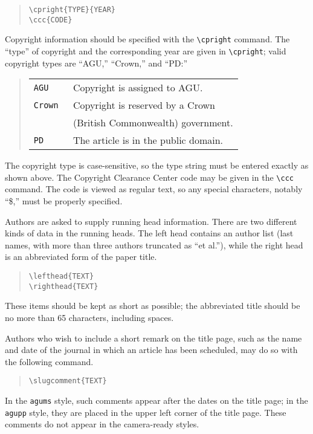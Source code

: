 \begin{quote}
\verb"\cpright{TYPE}{YEAR}"\\
\verb"\ccc{CODE}"
\end{quote}

Copyright information should be specified with the \verb"\cpright" 
command.  The ``type'' of copyright and the corresponding year are 
given in \verb"\cpright"; valid copyright types are ``AGU,'' 
``Crown,'' and ``PD:''
\begin{center}
\begin{quote}
\begin{tabular}{l@{\quad}p{3in}}
\tt AGU & Copyright is assigned to AGU.\\
\tt Crown & Copyright is re\-served by a Crown \\
& (British Commonwealth) government.\\
\tt PD & The article is in the public domain.\\
\end{tabular}
\end{quote}
\end{center}
The copyright type is case-sensitive, so the type string must be
entered exactly as shown above.  The Copyright Clearance Center 
code may be given in the \verb"\ccc" command.  The code is viewed
as regular text, so any special characters, notably ``\$,'' must 
be properly specified.

Authors are asked to supply running head information.  There are 
two different kinds of data in the running heads.  The left head 
contains an author list (last names, with more than three authors 
truncated as ``et al.''), while the right head is an abbreviated 
form of the paper title.
\begin{quote}
\verb"\lefthead{TEXT}"\\
\verb"\righthead{TEXT}"
\end{quote}
These items should be kept as short as possible; the abbreviated 
title should be no more than 65 characters, including spaces.

Authors who wish to include a short remark on the title page,
such as the name and date of the journal in which an article
has been scheduled, may do so with the following command.
\begin{quote}
\verb"\slugcomment{TEXT}"
\end{quote}
In the {\tt agums} style, such comments appear after the dates on 
the title page; in the {\tt agupp} style, they are placed in the 
upper left corner of the title page.  These comments do not appear 
in the camera-ready styles.

